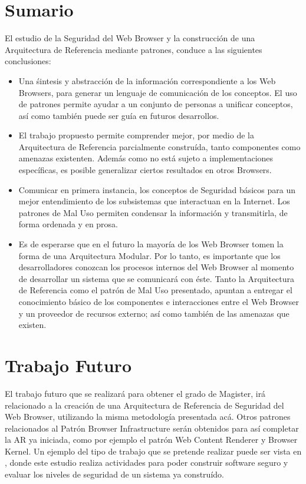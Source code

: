 \section{Sumario}
El estudio de la Seguridad del Web Browser y la construcción de una Arquitectura de Referencia mediante patrones, conduce a las siguientes conclusiones:
\begin{itemize}
	\item Una śintesis y abstracción de la información correspondiente a los Web Browsers, para generar un lenguaje de comunicación de los conceptos. El uso de patrones permite ayudar a un conjunto de personas a unificar conceptos, así como también puede ser guía en futuros desarrollos.
	\item El trabajo propuesto permite comprender mejor, por medio de la Arquitectura de Referencia parcialmente construída, tanto componentes como amenazas existenten. Además como no está sujeto a implementaciones específicas, es posible generalizar ciertos resultados en otros Browsers.
	\item Comunicar en primera instancia, los conceptos de Seguridad básicos para un mejor entendimiento de los subsistemas que interactuan en la Internet. Los patrones de Mal Uso permiten condensar la información y transmitirla, de forma ordenada y en prosa.
	\item Es de esperarse que en el futuro la mayoría de los Web Browser tomen la forma de una Arquitectura Modular. Por lo tanto, es importante que los desarrolladores conozcan los procesos internos del Web Browser al momento de desarrollar un sistema que se comunicará con éste. Tanto la Arquitectura de Referencia como el patrón de Mal Uso presentado, apuntan a entregar el conocimiento básico de los componentes e interacciones entre el Web Browser y un proveedor de recursos externo; así como también de las amenazas que existen.
	
\end{itemize}


\section{Trabajo Futuro}
El trabajo futuro que se realizará para obtener el grado de Magister, irá relacionado a la creación de una Arquitectura de Referencia de Seguridad del Web Browser, utilizando la misma metodología presentada acá. Otros patrones relacionados al Patrón Browser Infrastructure serán obtenidos para así completar la AR ya iniciada, como por ejemplo el patrón Web Content Renderer y Browser Kernel. Un ejemplo del tipo de trabajo que se pretende realizar puede ser vista en \cite{fernandez2014security}, donde este estudio realiza actividades para poder construir software seguro y evaluar los niveles de seguridad de un sistema ya construído.

